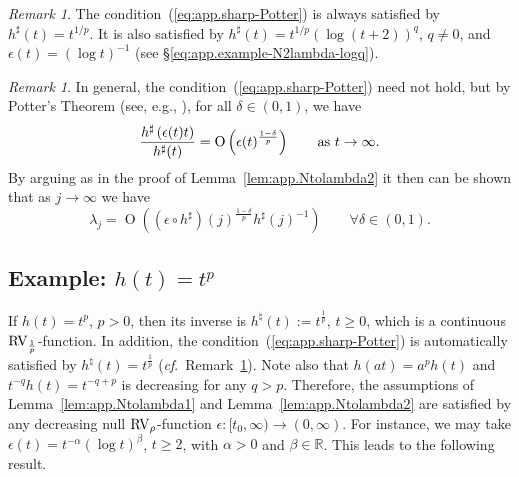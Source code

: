 \documentclass[10pt, a4paper]{amsart}
\newcommand{\R}{\mathbb{R}}
\newcommand{\op}{\operatorname}
\numberwithin{equation}{section}
\theoremstyle{definition}
\theoremstyle{remark}
\newtheorem{remark}[theorem]{Remark}
\newcommand{\RV}{\textup{RV}}
\begin{document}
\begin{remark}\label{rmk:app.sharp-Potter1}
 The condition~(\ref{eq:app.sharp-Potter}) is always satisfied by $h^\sharp(t)=t^{1/p}$. It is also satisfied by $h^\sharp(t)=t^{1/p}(\log(t+2))^q$, $q\neq 0$, and $\epsilon(t)=(\log t)^{-1}$ (see \S\ref{eq:app.example-N2lambda-logq}).  
\end{remark}

\begin{remark}
In general, the condition~(\ref{eq:app.sharp-Potter}) need not hold, but by Potter's Theorem (see, e.g., \cite[Theorem~1.5.6]{BGT:Cambridge87}), for all $\delta\in(0,1)$, we have
 \begin{equation*}
 \frac{h^\sharp\left(\epsilon(t)t\right)}{h^\sharp(t)}=\op{O}\left( \epsilon(t)^{\frac{1-\delta}{p}}\right)\qquad \textup{as}\ t\rightarrow \infty.
\end{equation*}
By arguing as in the proof of Lemma~\ref{lem:app.Ntolambda2} it then can be shown that as $j\rightarrow \infty$ we have
\begin{equation*}
 \lambda_j = \op{O}\left((\epsilon \circ h^\sharp)(j)^{\frac{1-\delta}{p}}h^\sharp(j)^{-1}\right) \qquad \forall \delta \in (0,1). 
\end{equation*}
\end{remark}

\subsection{Example: $h(t)=t^p$}
If $h(t)=t^p$, $p>0$, then its inverse is  $h^\natural(t):=t^{\frac1p}$, $t\geq 0$, which is a continuous $\RV_{\frac1p}$-function. In addition, the condition~(\ref{eq:app.sharp-Potter}) is automatically satisfied by $h^\natural(t)=t^{\frac1p}$ (\emph{cf}.~Remark~\ref{rmk:app.sharp-Potter1}). Note also that $h(at)=a^ph(t)$ and $t^{-q}h(t)=t^{-q+p}$ is decreasing for any $q>p$. Therefore, the assumptions of Lemma~\ref{lem:app.Ntolambda1} and Lemma~\ref{lem:app.Ntolambda2} are satisfied by any decreasing null $\RV_\rho$-function $\epsilon: [t_0,\infty)\rightarrow (0,\infty)$. For instance, we may take $\epsilon(t)=t^{-\alpha}(\log t)^{\beta}$, $t\geq 2$, with $\alpha>0$ and $\beta \in \R$. This leads to the following result.
\end{document}
